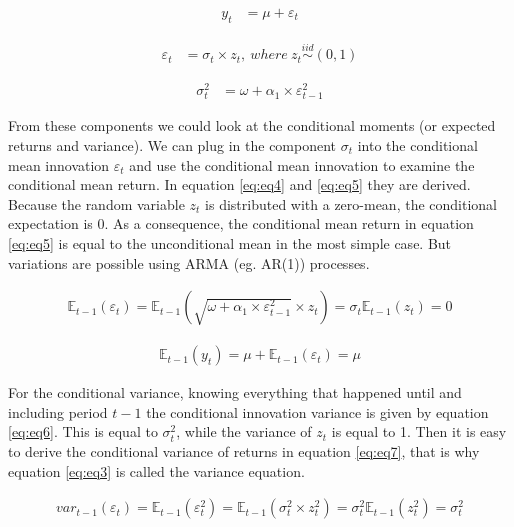 \documentclass[a4paper, twoside]{templates/ociamthesis}
\begin{document}
\begin{align} 
y_{t} &= \mu + \varepsilon_t
 \label{eq:eq1}
\end{align}

\begin{align} 
\varepsilon_{t} &= \sigma_t \times z_t, \ where \ z_t \stackrel{iid}{\sim} (0,1)
 \label{eq:eq2}
\end{align} 

\begin{align} 
\sigma_{t}^{2} &= \omega + \alpha_1 \times  \varepsilon_{t-1}^2 
 \label{eq:eq3}
\end{align}

\newpage

\noindent From these components we could look at the conditional moments (or expected returns and variance). We can plug in the component \(\sigma_t\) into the conditional mean innovation \(\varepsilon_{t}\) and use the conditional mean innovation to examine the conditional mean return. In equation \eqref{eq:eq4} and \eqref{eq:eq5} they are derived. Because the random variable \(z_t\) is distributed with a zero-mean, the conditional expectation is 0. As a consequence, the conditional mean return in equation \eqref{eq:eq5} is equal to the unconditional mean in the most simple case. But variations are possible using ARMA (eg. AR(1)) processes.

\begin{align} 
\mathbb{E}_{t-1}(\varepsilon_{t}) = \mathbb{E}_{t-1}(\sqrt{\omega + \alpha_1 \times  \varepsilon_{t-1}^2} \times z_t) = \sigma_t\mathbb{E}_{t-1}(z_t) = 0
 \label{eq:eq4}
\end{align} 

\begin{align} 
\mathbb{E}_{t-1}(y_{t}) = \mu + \mathbb{E}_{t-1}(\varepsilon_{t}) = \mu
 \label{eq:eq5}
\end{align}

\noindent For the conditional variance, knowing everything that happened until and including period \(t-1\) the conditional innovation variance is given by equation \eqref{eq:eq6}. This is equal to \(\sigma_t^2\), while the variance of \(z_t\) is equal to 1. Then it is easy to derive the conditional variance of returns in equation \eqref{eq:eq7}, that is why equation \eqref{eq:eq3} is called the variance equation.

\begin{align} 
var_{t-1}(\varepsilon_t) = \mathbb{E}_{t-1}(\varepsilon_{t}^2) = \mathbb{E}_{t-1}(\sigma_t^2 \times z_t^2) = \sigma_t^2\mathbb{E}_{t-1}(z_t^2) = \sigma_t^2
 \label{eq:eq6}
\end{align} 
\end{document}
